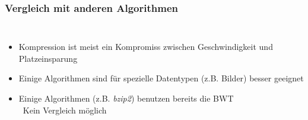 \documentclass[14pt,xcolor=dvipsnames,pdftex]{beamer}
\begin{document}
\begin{frame}
 \frametitle{Vergleich mit anderen Algorithmen}
 \begin{columns}[c,onlytextwidth]
    \begin{itemize}
    \item Kompression ist meist ein Kompromiss zwischen Geschwindigkeit und Platzeinsparung
    \item Einige Algorithmen sind für spezielle Datentypen (z.B. Bilder) besser geeignet
    \item Einige Algorithmen (z.B. \textit{bzip2}) benutzen bereits die BWT\\
    \textrightarrow\ Kein Vergleich möglich
    \end{itemize}
 \end{columns}
\end{frame}
\end{document}
